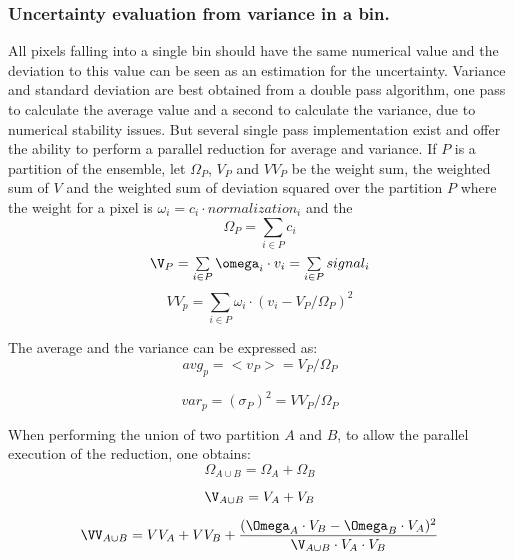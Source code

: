 \documentclass[preprint]{iucr}              %
\begin{document}
\subsubsection{Uncertainty evaluation from variance in a bin.}
All pixels falling into a single bin should have the same numerical value and the deviation to this value can be seen as an estimation for the uncertainty.
Variance and standard deviation are best obtained from a double pass algorithm, one pass to calculate the average value and a second to calculate the variance, 
due to numerical stability issues. 
But several single pass implementation exist \cite{variance2018} and offer the ability to perform a parallel reduction for average and variance. 
If $P$ is a partition of the ensemble, let $\Omega_{P}$, $V_{P}$ and $VV_{P}$  be the weight sum, the weighted sum of $V$ and the weighted sum of deviation squared over the partition $P$ 
where the weight for a pixel is $\omega_i = c_i \cdot normalization_i$ and the 
\begin{equation}
\Omega_{P} = \sum\limits_{i \in P} c_i
\end{equation}
\begin{equation}
\V_{P} = \sum\limits_{i \in P} \omega_i \cdot v_i =  \sum\limits_{i \in P} signal_i
\end{equation}
\begin{equation}
VV_{p} = \sum\limits_{i \in P} \omega_i \cdot (v_i - V_{P}/\Omega_{P})^2
\end{equation}

The average and the variance can be expressed as:
\begin{equation}
avg_{p} =  <v_P> = V_{P}/\Omega_{P} 
\end{equation}

\begin{equation}
var_{p} =  (\sigma_P)^2 = VV_{P}/\Omega_{P} 
\end{equation}


When performing the union of two partition $A$ and $B$, to allow the parallel execution of the reduction, one obtains:
\begin{equation}
\Omega_{A \cup B} =  \Omega_{A} + \Omega_{B} 
\end{equation}

\begin{equation}
\V_{A \cup B} =  V_{A} + V_{B} 
\end{equation}
  
\begin{equation}
\VV_{A \cup B} =  VV_{A} + VV_{B} +  \frac{(\Omega_{A} \cdot V_{B} - \Omega_{B}\cdot V_{A})^2}{\V_{A \cup B} \cdot  V_{A} \cdot V_{B}}
\end{equation}
  
\end{document}
